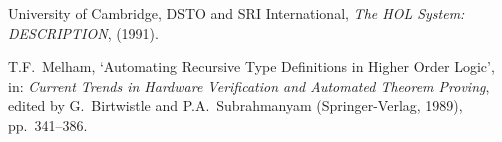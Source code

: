 \begin{thebibliography}{99}

University of Cambridge, {\small DSTO} and {\small SRI} International, 
{\it The HOL System: DESCRIPTION}, (1991).

T.F.\ Melham, `Automating Recursive Type Definitions 
in Higher Order Logic',
in: {\it Current Trends in Hardware Verification and
Automated Theorem Proving\/}, edited by G.\ Birtwistle 
and P.A.\ Subrahmanyam
(Springer-Verlag, 1989), pp.\ 341--386.

\end{thebibliography}


